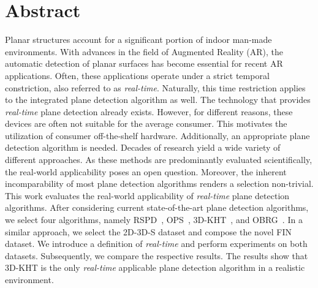 \documentclass[main.tex]{subfiles}
\begin{document}
\chapter*{Abstract}
\thispagestyle{empty}
Planar structures account for a significant portion of indoor man-made environments.
With advances in the field of Augmented Reality (AR), the automatic detection of planar surfaces has become essential for recent AR applications. Often, these applications operate under a strict temporal constriction, also referred to as \textit{real-time}. Naturally, this time restriction applies to the integrated plane detection algorithm as well. The technology that provides \textit{real-time} plane detection already exists. However, for different reasons, these devices are often not suitable for the average consumer. This motivates the utilization of consumer off-the-shelf hardware. Additionally, an appropriate plane detection algorithm is needed. Decades of research yield a wide variety of different approaches. As these methods are predominantly evaluated scientifically, the real-world applicability poses an open question. Moreover, the inherent incomparability of most plane detection algorithms renders a selection non-trivial.\\
\phantom{test} This work evaluates the real-world applicability of \textit{real-time} plane detection algorithms. After considering current state-of-the-art plane detection algorithms, we select four algorithms, namely RSPD~\cite{Araújo_Oliveira_2020}, OPS~\cite{Sun_Mordohai_2019}, 3D-KHT~\cite{LimbergerOliveira2015HT3D}, and OBRG~\cite{Vo_Truong-Hong_Laefer_Bertolotto_2015}. In a similar approach, we select the 2D-3D-S dataset and compose the novel FIN dataset. We introduce a definition of \textit{real-time} and perform experiments on both datasets. Subsequently, we compare the respective results. The results show that 3D-KHT is the only \textit{real-time} applicable plane detection algorithm in a realistic environment.
\end{document}
